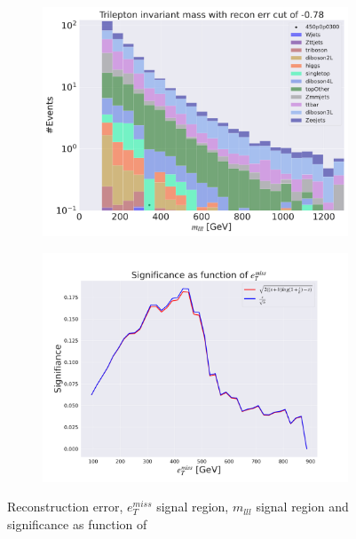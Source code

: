 \begin{figure}[H]
    \hfill
    \begin{subfigure}{.40\textwidth}
        \includegraphics[width=\textwidth]{Figures/AE_testing/big/3lep/b_data_recon_big_rm3_feats_sig_450p0p0300_mlll_recon_errcut_-0.78.pdf}
        \caption{}
        \label{fig:AE_3lep_big_mlll_450_3}
    \end{subfigure}
    \hfill   
    \begin{subfigure}{.40\textwidth}
        \includegraphics[width=\textwidth]{Figures/AE_testing/big/3lep/significance_etmiss_450p0p0300_-0.7824137709201433.pdf}
        \caption{}
        \label{fig:AE_3lep_big_signi_450_3}
    \end{subfigure}
    \hfill      
    \caption[3lep deep network | $450p300$ | AE | 3]{Reconstruction error, $e_T^{miss}$ signal region, $m_{lll}$ signal region and significance as function of 
}
\end{figure}
